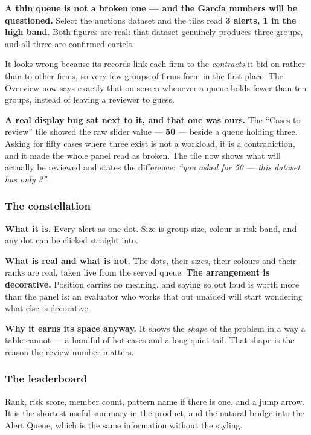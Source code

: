 \documentclass[11pt,a4paper]{article}
\begin{document}
\begin{warnbox}
\textbf{A thin queue is not a broken one --- and the Garc\'ia numbers will be
questioned.} Select the auctions dataset and the tiles read \textbf{3 alerts,
1 in the high band}. Both figures are real: that dataset genuinely produces
three groups, and all three are confirmed cartels.

It looks wrong because its records link each firm to the \emph{contracts} it bid
on rather than to other firms, so very few groups of firms form in the first
place. The Overview now says exactly that on screen whenever a queue holds
fewer than ten groups, instead of leaving a reviewer to guess.

\textbf{A real display bug sat next to it, and that one was ours.} The
``Cases to review'' tile showed the raw slider value --- \textbf{50} --- beside a
queue holding three. Asking for fifty cases where three exist is not a
workload, it is a contradiction, and it made the whole panel read as broken.
The tile now shows what will actually be reviewed and states the difference:
\emph{``you asked for 50 --- this dataset has only 3''}.
\end{warnbox}

\subsubsection*{The constellation}

\textbf{What it is.} Every alert as one dot. Size is group size, colour is risk
band, and any dot can be clicked straight into.

\textbf{What is real and what is not.} The dots, their sizes, their colours and
their ranks are real, taken live from the served queue. \textbf{The arrangement
is decorative.} Position carries no meaning, and saying so out loud is worth
more than the panel is: an evaluator who works that out unaided will start
wondering what else is decorative.

\textbf{Why it earns its space anyway.} It shows the \emph{shape} of the
problem in a way a table cannot --- a handful of hot cases and a long quiet
tail. That shape is the reason the review number matters.

\subsubsection*{The leaderboard}

Rank, risk score, member count, pattern name if there is one, and a jump arrow.
It is the shortest useful summary in the product, and the natural bridge into
the Alert Queue, which is the same information without the styling.
\end{document}
